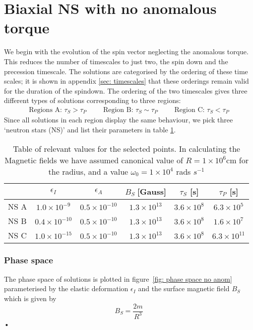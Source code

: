 \documentclass[/home/greg/Thesis/main/main.tex]{subfiles}
\begin{document}
\FloatBarrier
\section{Biaxial NS with no anomalous torque}
We begin with the evolution of the spin vector neglecting the anomalous torque.
This reduces the number of timescales to just two, the spin down and the
precession timescale. The solutions are categorised by the ordering of these
time scales; it is shown  in appendix \ref{sec: timescales} that these
orderings remain valid for the duration of the spindown. The ordering of the
two timescales gives three different types of solutions corresponding to three
regions:
\begin{align}
    \textrm{Regions A: } \tau_{S} > \tau_{P} &&& 
    \textrm{Region B: } \tau_{S} \sim \tau_{P} &&& 
    \textrm{Region C: } \tau_{S} < \tau_{P}
\end{align}
Since all solutions in each region display the same behaviour, we pick three 
`neutron stars (NS)' and list their parameters in table \ref{tab: A B C params}. 

\renewcommand{\arraystretch}{1.2}
\begin{table}[htb]
\centering
{\small
	\begin{tabular}[h]{|l|c|c|c|c|c|}\hline
		&  $\epsilon_{I}$  & $\epsilon_{A} $ & 	$B_{S} \; $[Gauss] & $\tau_{S}$ [s] & $ \tau_{P}$  [s] \\ \hline
	NS A 	&  $  1.0\times 10^{-9}  $  & $  0.5\times 10^{-10}  $ & 	$  1.3\times 10^{13}  $   & $  3.6\times 10^{8}  $ & $  6.3\times 10^{5}  $\\
	NS B 	&  $  0.4\times 10^{-10}  $  & $  0.5\times 10^{-10}  $ & 	$  1.3\times 10^{13}  $   & $  3.6\times 10^{8}  $ & $  1.6\times 10^{7}  $\\ 
	NS C 	&  $  1.0\times 10^{-15}  $  & $  0.5\times 10^{-10}  $ & 	$  1.3\times 10^{13}  $   & $  3.6\times 10^{8}  $ & $  6.3\times 10^{11}  $\\ \hline
	\end{tabular}
}
\caption{Table of relevant values for the selected points. In calculating the
    Magnetic fields we have assumed canonical value of $R=1\times10^{6}$cm for
    the radius, and a value $\omega_{0} = 1\times10^{4}$ rads $s^{-1}$}
\label{tab: A B C params}
\end{table}

\subsubsection{Phase space}
The phase space of solutions is plotted in figure~\ref{fig: phase space no anom}
parameterised by the elastic deformation $\epsilon_{I}$ and the surface magnetic
field $B_{S}$ which is given by~\citep[][ p. 278]{Shapiro83}
\begin{equation}
B_{S} = \frac{2m}{R^{3}}
\end{equation}•
\end{document}
